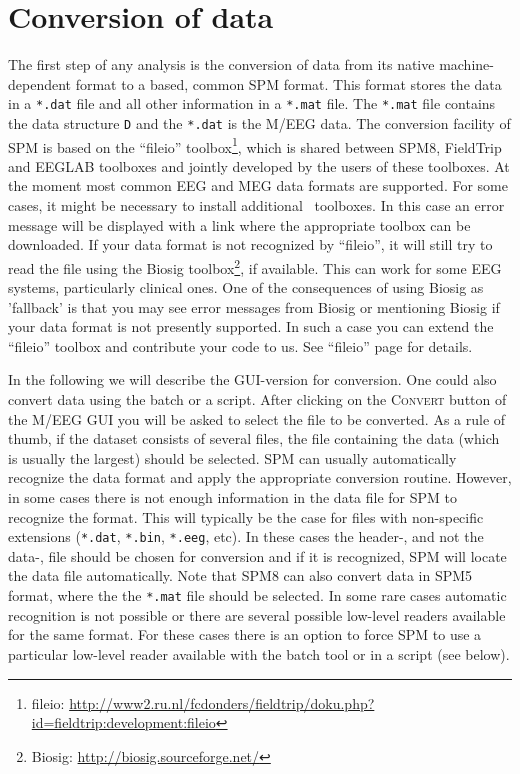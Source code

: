 \section{Conversion of data}
The first step of any analysis is the conversion of data from its native machine-dependent format to a \matlab\-based, common SPM format. This format stores the data in a \texttt{*.dat} file and all other information in a \texttt{*.mat} file. The \texttt{*.mat} file contains the data structure \texttt{D} and the \texttt{*.dat} is the M/EEG data. The conversion facility of SPM is based on the ``fileio'' toolbox\footnote{fileio: \url{http://www2.ru.nl/fcdonders/fieldtrip/doku.php?id=fieldtrip:development:fileio}}, which is shared between SPM8, FieldTrip and EEGLAB toolboxes and jointly developed by the users of these toolboxes. At the moment most common EEG and MEG data formats are supported. For some cases, it might be necessary to install additional \matlab\ toolboxes. In this case an error message will be displayed with a link where the appropriate toolbox can be downloaded. If your data format is not recognized by ``fileio'', it will still try to read the file using the Biosig toolbox\footnote{Biosig: \url{http://biosig.sourceforge.net/}}, if available. This can work for some EEG systems, particularly clinical ones. One of the consequences of using Biosig as 'fallback' is that you may see error messages from Biosig or mentioning Biosig if your data format is not presently supported. In such a case you can extend the ``fileio'' toolbox and contribute your code to us. See ``fileio'' page for details.

In the following we will describe the GUI-version for conversion. One could also convert data using the batch or a script. After clicking on the \textsc{Convert} button of the M/EEG GUI you will be asked to select the file to be converted. As a rule of thumb, if the dataset consists of several files, the file containing the data (which is usually the largest) should be selected. SPM can usually automatically recognize the data format and apply the appropriate conversion routine. However, in some cases there is not enough information in the data file for SPM to recognize the format. This will typically be the case for files with non-specific extensions (\texttt{*.dat}, \texttt{*.bin}, \texttt{*.eeg}, etc). In these cases the header-, and not the data-, file should be chosen for conversion and if it is recognized, SPM will locate the data file automatically. Note that SPM8 can also convert data in SPM5 format, where the the \texttt{*.mat} file should be selected. In some rare cases automatic recognition is not possible or there are several possible low-level readers available for the same format. For these cases there is an option to force SPM to use a particular low-level reader available with the batch tool or in a script (see below).

